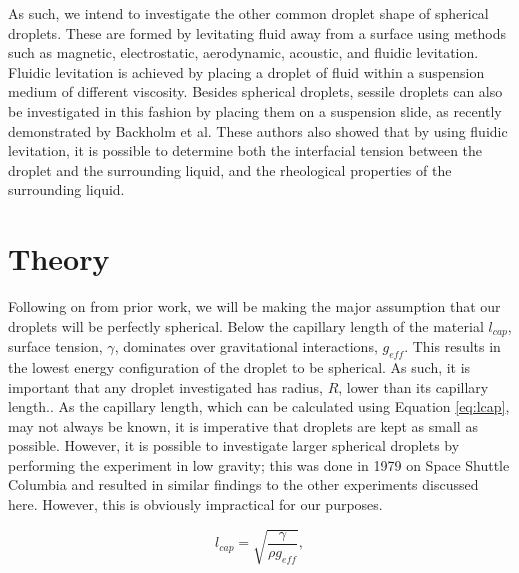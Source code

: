 \documentclass{physics_article_B}
\begin{document}
As such, we intend to investigate the other common droplet shape of spherical droplets. These are formed by levitating fluid away from a surface using methods such as magnetic\cite{temperton, hill}, electrostatic\cite{mugele, wong}, aerodynamic\cite{benmore}, acoustic\cite{Temperton2012, Yarin1998}, and fluidic levitation. Fluidic levitation is achieved by placing a droplet of fluid within a suspension medium of different viscosity. Besides spherical droplets, sessile droplets can also be investigated in this fashion by placing them on a suspension slide, as recently demonstrated by Backholm et al\cite{Backholm2017}. These authors also showed that\cite{Backholm2017} by using fluidic levitation, it is possible to determine both the interfacial tension between the droplet and the surrounding liquid, and the rheological properties of the surrounding liquid. %

\section{Theory\label{sect:theory}}

Following on from prior work, we will be making the major assumption that our droplets will be perfectly spherical. Below the capillary length of the material $l_{cap}$, surface tension, $\gamma$, dominates over gravitational interactions, $g_{eff}$. This results in the lowest energy configuration of the droplet to be spherical. As such, it is important that any droplet investigated has radius, $R$, lower than its capillary length.. As the capillary length, which can be calculated using Equation \ref{eq:lcap}, may not always be known, it is imperative that droplets are kept as small as possible. However, it is possible to investigate larger spherical droplets by performing the experiment in low gravity; this was done in 1979\cite{holt} on Space Shuttle Columbia and resulted in similar findings to the other experiments discussed here. However, this is obviously impractical for our purposes.

\begin{equation} 
\label{eq:lcap}
l_{cap} = \sqrt{\frac{\gamma }{\rho g_{eff} }} , 
\end{equation}
    
\end{document}
